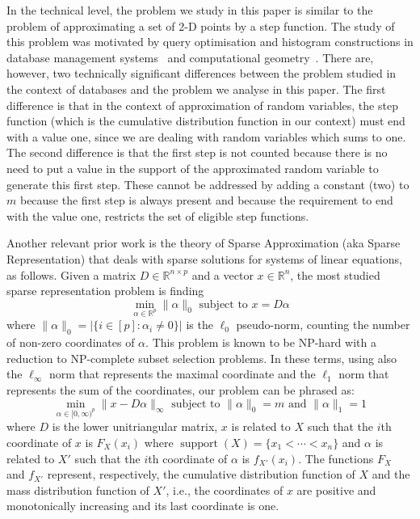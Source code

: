 \documentclass[letterpaper]{article} %
\DeclareMathOperator{\support}{support}
\begin{document}
In the technical level, the problem we study in this paper is similar to the problem of approximating a set of 2-D points by a step function. The study of this problem was motivated by query optimisation and histogram constructions in database management systems~\cite{applf12,applf13,applf14,applf17,applf18,Fournier2011} and computational geometry~\cite{diaz2001fitting,fournier2008fitting}. There are, however, two technically significant differences between the problem studied in the context of databases and the problem we analyse in this paper. The first difference is that in the context of approximation of random variables, the step function (which is the cumulative distribution function in our context)  must end with a value one, since we are dealing with random variables which sums to one. The second difference is that the first step is not counted because there is no need to put a value in the support of the approximated random variable to generate this first step. These cannot be addressed by adding a constant (two) to $m$ because the first step is always present and because the requirement to end with the value one, restricts the set of eligible step functions. 

Another relevant prior work is the theory of Sparse Approximation (aka Sparse Representation) that deals with sparse solutions for systems of linear equations, as follows. 
Given a matrix $D \in \mathbb{R}^{n \times p}$ and a vector $x \in \mathbb{R}^n$, the most studied sparse representation problem is finding 
$$
\min_{\alpha \in \mathbb{R}^p} \|\alpha\|_0 \text{ subject to } x = D\alpha
$$
where $\|\alpha\|_0 = |\{ i \in [p]: \alpha_i \neq 0 \}|$ is the $\ell_0$ pseudo-norm, counting the number of non-zero coordinates of $\alpha$. This problem is known to be NP-hard with a reduction to NP-complete subset selection problems.
In these terms, using also the $\ell_\infty$ norm that represents the maximal coordinate and the $\ell_1$ norm that represents the sum of the coordinates, our problem can be phrased as:
\begin{equation}\label{eq:linear}
\min_{\alpha \in [0,\infty)^p}\|x - D\alpha\|_{\infty} \text{ subject to }  \|\alpha\|_0 = m \text{ and } \|\alpha\|_1=1
\end{equation}
where $D$ is the lower unitriangular matrix, $x$ is related to $X$ such that the $i$th coordinate of $x$ is $F_X(x_i)$ where $\support(X)=\{x_1 < \cdots < x_n\}$ and $\alpha$ is related to $X'$ such that the $i$th coordinate of $\alpha$ is $f_{X'}(x_i)$. The functions $F_X$ and $f_{X'}$ represent, respectively, the cumulative distribution function of $X$ and the mass distribution function of $X'$, i.e.,  the coordinates of $x$ are positive and monotonically increasing and its last coordinate is one. %
\end{document}
